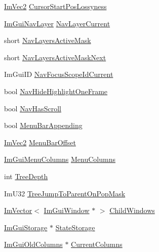 \begin{DoxyCompactItemize}
\hyperlink{structImVec2}{Im\+Vec2} \hyperlink{structImGuiWindowTempData_a390a86bb16c01045a8793e0d60b668d8}{Cursor\+Start\+Pos\+Lossyness}
\item 
\hyperlink{imgui__internal_8h_afb412215b8327dc2c6af2c19fdca64c6}{Im\+Gui\+Nav\+Layer} \hyperlink{structImGuiWindowTempData_a95e11283d6f15aff01b8370267edd61c}{Nav\+Layer\+Current}
\item 
short \hyperlink{structImGuiWindowTempData_a4191d0684aa688e31c69a618490a3f32}{Nav\+Layers\+Active\+Mask}
\item 
short \hyperlink{structImGuiWindowTempData_a585804d9f68a5973a3e1f4d47b18103e}{Nav\+Layers\+Active\+Mask\+Next}
\item 
Im\+Gui\+ID \hyperlink{structImGuiWindowTempData_ae18a095a7a0bca78d8ebe6fd037afd3a}{Nav\+Focus\+Scope\+Id\+Current}
\item 
bool \hyperlink{structImGuiWindowTempData_a039070c94cf3dc0534257becd8d5bce8}{Nav\+Hide\+Highlight\+One\+Frame}
\item 
bool \hyperlink{structImGuiWindowTempData_a5a506f02b64ed01f845a3d473207c3c6}{Nav\+Has\+Scroll}
\item 
bool \hyperlink{structImGuiWindowTempData_a9f0df1a4566ded9c6ec2629f29af20c6}{Menu\+Bar\+Appending}
\item 
\hyperlink{structImVec2}{Im\+Vec2} \hyperlink{structImGuiWindowTempData_ad83c8b499933d7c765dc564e2d75c302}{Menu\+Bar\+Offset}
\item 
\hyperlink{structImGuiMenuColumns}{Im\+Gui\+Menu\+Columns} \hyperlink{structImGuiWindowTempData_a7c8873ea116f452f145e17ce8275072f}{Menu\+Columns}
\item 
int \hyperlink{structImGuiWindowTempData_aaa472783238040464cce2984c1a3ed47}{Tree\+Depth}
\item 
Im\+U32 \hyperlink{structImGuiWindowTempData_a19b841532f2e8997bb6fadcdc9f39cfc}{Tree\+Jump\+To\+Parent\+On\+Pop\+Mask}
\item 
\hyperlink{structImVector}{Im\+Vector}$<$ \hyperlink{structImGuiWindow}{Im\+Gui\+Window} $\ast$ $>$ \hyperlink{structImGuiWindowTempData_ac5ffaaf397b8501b523aa55aa7d34d3d}{Child\+Windows}
\item 
\hyperlink{structImGuiStorage}{Im\+Gui\+Storage} $\ast$ \hyperlink{structImGuiWindowTempData_ae8dad2f03fe834cb6b24cb76efe62c59}{State\+Storage}
\item 
\hyperlink{structImGuiOldColumns}{Im\+Gui\+Old\+Columns} $\ast$ \hyperlink{structImGuiWindowTempData_ad00cc183f6adc8e1bce723de265bf9f6}{Current\+Columns}
\item 

\end{DoxyCompactItemize}
